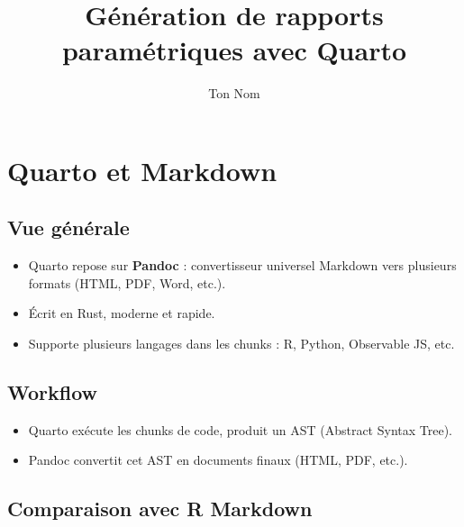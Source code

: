 \documentclass[
  letterpaper,
  DIV=11,
  numbers=noendperiod]{scrartcl}
\title{Génération de rapports paramétriques avec Quarto}
\author{Ton Nom}
\date{}
\providecommand{\tightlist}{%
  \setlength{\itemsep}{0pt}\setlength{\parskip}{0pt}}\usepackage{longtable,booktabs,array}
\renewcommand*\contentsname{Table of contents}
\newcommand\contentsname{Table of contents}
\begin{document}
\maketitle

\renewcommand*\contentsname{Table of contents}
{
\hypersetup{linkcolor=}
\setcounter{tocdepth}{3}
\tableofcontents
}

\section{Quarto et Markdown}\label{quarto-et-markdown}

\subsection{Vue générale}\label{vue-guxe9nuxe9rale}

\begin{itemize}
\tightlist
\item
  Quarto repose sur \textbf{Pandoc} : convertisseur universel Markdown
  vers plusieurs formats (HTML, PDF, Word, etc.).
\item
  Écrit en Rust, moderne et rapide.
\item
  Supporte plusieurs langages dans les chunks : R, Python, Observable
  JS, etc.
\end{itemize}

\subsection{Workflow}\label{workflow}

\begin{itemize}
\tightlist
\item
  Quarto exécute les chunks de code, produit un AST (Abstract Syntax
  Tree).
\item
  Pandoc convertit cet AST en documents finaux (HTML, PDF, etc.).
\end{itemize}

\subsection{Comparaison avec R
Markdown}\label{comparaison-avec-r-markdown}
\end{document}
